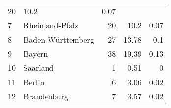 \begin{longtable}{lXrrr}
       \num{20} &
       \num[round-mode=places,round-precision=2]{10,2} &
         \num[round-mode=places,round-precision=2]{0,07} \\

     7 &
     \multicolumn{1}{X}{ Rheinland-Pfalz   } &


       \num{20} &
       \num[round-mode=places,round-precision=2]{10,2} &
         \num[round-mode=places,round-precision=2]{0,07} \\

     8 &
     \multicolumn{1}{X}{ Baden-Württemberg   } &


       \num{27} &
       \num[round-mode=places,round-precision=2]{13,78} &
         \num[round-mode=places,round-precision=2]{0,1} \\

     9 &
     \multicolumn{1}{X}{ Bayern   } &


       \num{38} &
       \num[round-mode=places,round-precision=2]{19,39} &
         \num[round-mode=places,round-precision=2]{0,13} \\

     10 &
     \multicolumn{1}{X}{ Saarland   } &


       \num{1} &
       \num[round-mode=places,round-precision=2]{0,51} &
         \num[round-mode=places,round-precision=2]{0} \\

     11 &
     \multicolumn{1}{X}{ Berlin   } &


       \num{6} &
       \num[round-mode=places,round-precision=2]{3,06} &
         \num[round-mode=places,round-precision=2]{0,02} \\

     12 &
     \multicolumn{1}{X}{ Brandenburg   } &


       \num{7} &
       \num[round-mode=places,round-precision=2]{3,57} &
         \num[round-mode=places,round-precision=2]{0,02} \\


\end{longtable}
